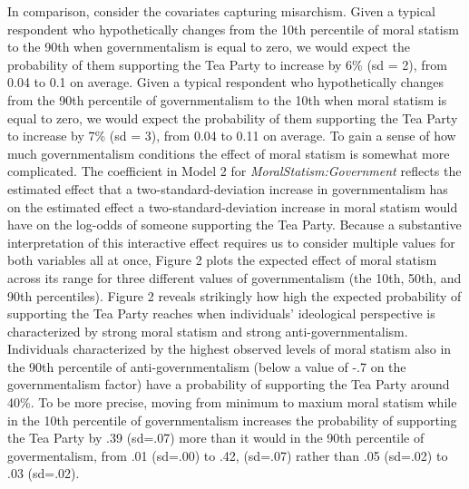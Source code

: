 \documentclass[12pt,]{article}
\begin{document}
In comparison, consider the covariates capturing misarchism. Given a
typical respondent who hypothetically changes from the 10th percentile
of moral statism to the 90th when governmentalism is equal to zero, we
would expect the probability of them supporting the Tea Party to
increase by 6\% (sd = 2), from 0.04 to 0.1 on average. Given a typical
respondent who hypothetically changes from the 90th percentile of
governmentalism to the 10th when moral statism is equal to zero, we
would expect the probability of them supporting the Tea Party to
increase by 7\% (sd = 3), from 0.04 to 0.11 on average. To gain a sense
of how much governmentalism conditions the effect of moral statism is
somewhat more complicated. The coefficient in Model 2 for
\emph{MoralStatism:Government} reflects the estimated effect that a
two-standard-deviation increase in governmentalism has on the estimated
effect a two-standard-deviation increase in moral statism would have on
the log-odds of someone supporting the Tea Party. Because a substantive
interpretation of this interactive effect requires us to consider
multiple values for both variables all at once, Figure 2 plots the
expected effect of moral statism across its range for three different
values of governmentalism (the 10th, 50th, and 90th percentiles). Figure
2 reveals strikingly how high the expected probability of supporting the
Tea Party reaches when individuals' ideological perspective is
characterized by strong moral statism and strong anti-governmentalism.
Individuals characterized by the highest observed levels of moral
statism also in the 90th percentile of anti-governmentalism (below a
value of -.7 on the governmentalism factor) have a probability of
supporting the Tea Party around 40\%. To be more precise, moving from
minimum to maxium moral statism while in the 10th percentile of
governmentalism increases the probability of supporting the Tea Party by
.39 (sd=.07) more than it would in the 90th percentile of
govermentalism, from .01 (sd=.00) to .42, (sd=.07) rather than .05
(sd=.02) to .03 (sd=.02).
\end{document}
